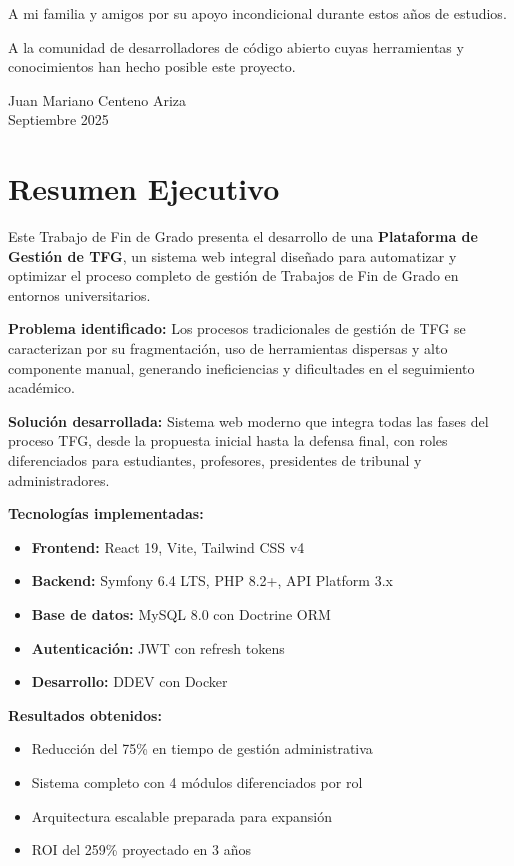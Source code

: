 A mi familia y amigos por su apoyo incondicional durante estos años de estudios.

A la comunidad de desarrolladores de código abierto cuyas herramientas y 
conocimientos han hecho posible este proyecto.

\vspace{2cm}
\begin{flushright}
Juan Mariano Centeno Ariza\\
Septiembre 2025
\end{flushright}

\newpage
\chapter*{Resumen Ejecutivo}

Este Trabajo de Fin de Grado presenta el desarrollo de una \textbf{Plataforma 
de Gestión de TFG}, un sistema web integral diseñado para automatizar y 
optimizar el proceso completo de gestión de Trabajos de Fin de Grado en 
entornos universitarios.

\textbf{Problema identificado:} Los procesos tradicionales de gestión de TFG 
se caracterizan por su fragmentación, uso de herramientas dispersas y 
alto componente manual, generando ineficiencias y dificultades en el 
seguimiento académico.

\textbf{Solución desarrollada:} Sistema web moderno que integra todas las 
fases del proceso TFG, desde la propuesta inicial hasta la defensa final, 
con roles diferenciados para estudiantes, profesores, presidentes de 
tribunal y administradores.

\textbf{Tecnologías implementadas:}
\begin{itemize}
    \item \textbf{Frontend:} React 19, Vite, Tailwind CSS v4
    \item \textbf{Backend:} Symfony 6.4 LTS, PHP 8.2+, API Platform 3.x
    \item \textbf{Base de datos:} MySQL 8.0 con Doctrine ORM
    \item \textbf{Autenticación:} JWT con refresh tokens
    \item \textbf{Desarrollo:} DDEV con Docker
\end{itemize}

\textbf{Resultados obtenidos:}
\begin{itemize}
    \item Reducción del 75\% en tiempo de gestión administrativa
    \item Sistema completo con 4 módulos diferenciados por rol
    \item Arquitectura escalable preparada para expansión
    \item ROI del 259\% proyectado en 3 años
\end{itemize}

